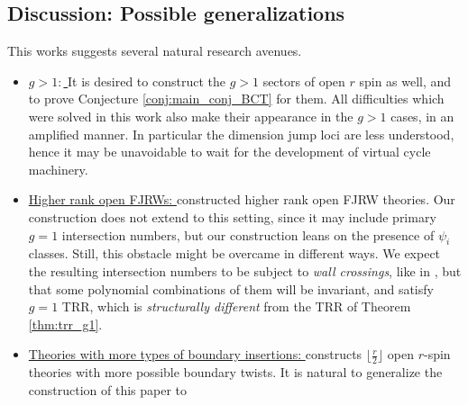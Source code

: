 \documentclass[11pt]{amsart}
\theoremstyle{definition}
\theoremstyle{remark}
\newcommand{\<}{\left<}
\renewcommand{\>}{\right>}
\numberwithin{equation}{section}
\begin{document}
\subsection{Discussion: Possible generalizations}
This works suggests several natural research avenues. 
\begin{itemize}
    \item \underline{$g>1:$ }It is desired to construct the $g>1$ sectors of open $r$ spin as well, and to prove Conjecture \ref{conj:main_conj_BCT} for them. All difficulties which were solved in this work also make their appearance in the %
$g>1$ cases, in %
an amplified manner. %
In particular the %
dimension jump loci are less understood, hence it may be unavoidable to wait for the development of virtual cycle machinery. 
    \item \underline{Higher rank open FJRWs: }\cite{GKT2} constructed higher rank open FJRW theories. Our construction does not extend to %
this setting, since %
it may include primary $g=1$ intersection numbers, but our construction leans on the presence of $\psi_i$ classes. Still, this obstacle might be overcame in different ways. We expect the resulting intersection numbers to be subject to \emph{wall crossings}, like in \cite{GKT2}, but that some polynomial combinations of them will %
be invariant, and %
satisfy $g=1$ TRR, which is \emph{structurally different} from the TRR of %
Theorem \ref{thm:trr_g1}.
    \item \underline{Theories with more types of boundary insertions: }\cite{TZ2} constructs %
$\lfloor\frac{r}{2}\rfloor$ open $r$-spin theories with more possible boundary twists. It is natural to generalize the construction of this paper to %

\end{itemize}
\end{document}
